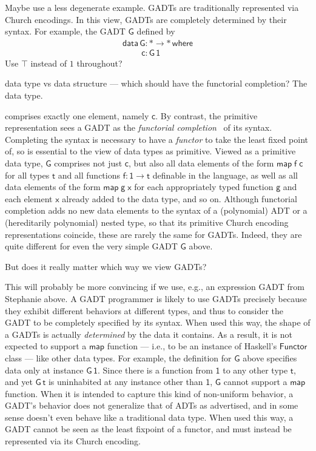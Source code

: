\documentclass[acmsmall,screen,review,anonymous]{acmart}
\theoremstyle{definition}
\begin{document}
{\color{red} Maybe use a less degenerate example.}  GADTs are
traditionally represented via Church encodings. In this view, GADTs
are completely determined by their syntax. For example, the GADT
$\mathsf{G}$ defined by
\[\begin{array}{l}
\mathsf{data\,G : * \to *\,where}\\
\mathsf{\;\;\;\;\;\;\;\;c : G\,1}
\end{array}\]
{\color{blue} Use $\top$ instead of $1$ throughout?}

\noindent
{\color{blue} data type vs data structure --- which should have the
functorial completion? The data type.}

\noindent
comprises exactly one element, namely $\mathsf{c}$. By contrast, the
primitive representation sees a GADT as the {\em functorial
  completion}~\cite{jp19} of its syntax. {\color{blue} Completing the
  syntax is necessary to have a {\em functor} to take the least fixed
  point of, so is essential to the view of data types as primitive.}
Viewed as a primitive data type, $\mathsf{G}$ comprises not just
$\mathsf{c}$, but also all data elements of the form
$\mathsf{map\;f\;c}$ for all types $\mathsf{t}$ and all functions
$\mathsf{f : 1 \to t}$ definable in the language, as well as all data
elements of the form $\mathsf{map\;g\;x}$ for each appropriately typed
function $\mathsf{g}$ and each element $\mathsf{x}$ already added to
the data type, and so on.  Although functorial completion adds no new
data elements to the syntax of a (polynomial) ADT or a (hereditarily
polynomial) nested type, so that its primitive Church encoding
representations coincide, these are rarely the same for GADTs.
Indeed, they are quite different for even the very simple GADT
$\mathsf{G}$ above.

But does it really matter which way we view GADTs?

{\color{red} This will probably be more convincing if we use, e.g.,
  an expression GADT from Stephanie above.}
A GADT programmer is likely to use GADTs precisely because they
exhibit different behaviors at different types, and thus to consider
the GADT to be completely specified by its syntax. When used this way,
the shape of a GADTs is actually {\em determined} by the data it
contains. As a result, it is not expected to support a $\mathsf{map}$
function --- i.e., to be an instance of Haskell's $\mathsf{Functor}$
class --- like other data types. For example, the definition for
$\mathsf{G}$ above specifies data only at instance $\mathsf{G\,1}$.
Since there is a function from $\mathsf{1}$ to any other type
$\mathsf{t}$, and yet $\mathsf{G\,t}$ is uninhabited at any instance
other than $\mathsf{1}$, $\mathsf{G}$ cannot support a $\mathsf{map}$
function. When it is intended to capture this kind of non-uniform
behavior, a GADT's behavior does not generalize that of ADTs as
advertised, and in some sense doesn't even behave like a traditional
data type.  When used this way, a GADT cannot be seen as the least
fixpoint of a functor, and must instead be represented via its Church
encoding.
\end{document}

